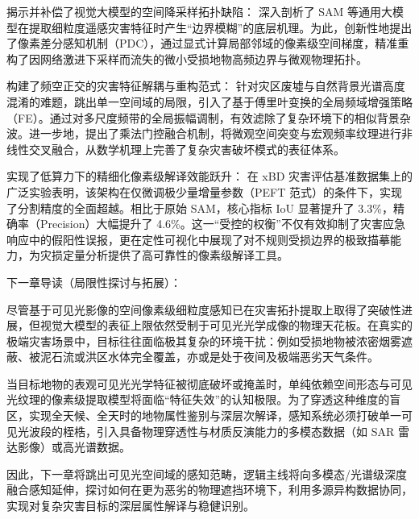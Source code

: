 揭示并补偿了视觉大模型的空间降采样拓扑缺陷： 深入剖析了 SAM 等通用大模型在提取细粒度遥感灾害特征时产生“边界模糊”的底层机理。为此，创新性地提出了像素差分感知机制（PDC），通过显式计算局部邻域的像素级空间梯度，精准重构了因网络激进下采样而流失的微小受损地物高频边界与微观物理拓扑。

构建了频空正交的灾害特征解耦与重构范式： 针对灾区废墟与自然背景光谱高度混淆的难题，跳出单一空间域的局限，引入了基于傅里叶变换的全局频域增强策略（FE）。通过对多尺度频带的全局振幅调制，有效滤除了复杂环境下的相似背景杂波。进一步地，提出了乘法门控融合机制，将微观空间突变与宏观频率纹理进行非线性交叉融合，从数学机理上完善了复杂灾害破坏模式的表征体系。

实现了低算力下的精细化像素级解译效能跃升： 在 xBD 灾害评估基准数据集上的广泛实验表明，该架构在仅微调极少量增量参数（PEFT 范式）的条件下，实现了分割精度的全面超越。相比于原始 SAM，核心指标 IoU 显著提升了 3.3\%，精确率（Precision）大幅提升了 4.6\%。这一“受控的权衡”不仅有效抑制了灾害应急响应中的假阳性误报，更在定性可视化中展现了对不规则受损边界的极致描摹能力，为灾损定量分析提供了高可靠性的像素级解译工具。

下一章导读（局限性探讨与拓展）：

尽管基于可见光影像的空间像素级细粒度感知已在灾害拓扑提取上取得了突破性进展，但视觉大模型的表征上限依然受制于可见光光学成像的物理天花板。在真实的极端灾害场景中，目标往往面临极其复杂的环境干扰：例如受损地物被浓密烟雾遮蔽、被泥石流或洪区水体完全覆盖，亦或是处于夜间及极端恶劣天气条件。

当目标地物的表观可见光光学特征被彻底破坏或掩盖时，单纯依赖空间形态与可见光纹理的像素级提取模型将面临“特征失效”的认知极限。为了穿透这种维度的盲区，实现全天候、全天时的地物属性鉴别与深层次解译，感知系统必须打破单一可见光波段的桎梏，引入具备物理穿透性与材质反演能力的多模态数据（如 SAR 雷达影像）或高光谱数据。

因此，下一章将跳出可见光空间域的感知范畴，逻辑主线将向多模态/光谱级深度融合感知延伸，探讨如何在更为恶劣的物理遮挡环境下，利用多源异构数据协同，实现对复杂灾害目标的深层属性解译与稳健识别。